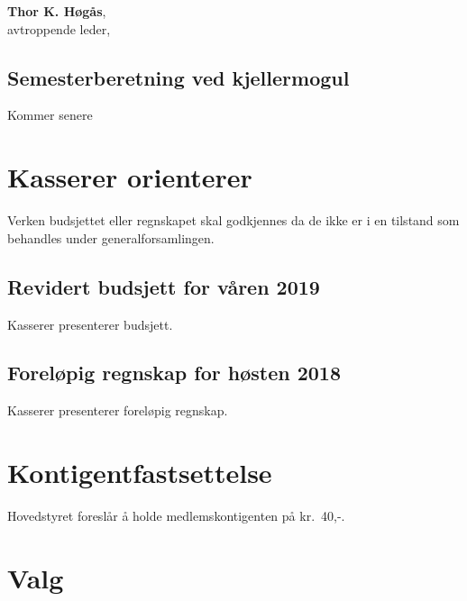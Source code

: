 \documentclass[10pt,norsk,a4paper]{article}
\begin{document}
\textbf{Thor K. Høgås}, \\
avtroppende leder, \date{\emph{23. mai 2019}}

\newpage

\subsection{Semesterberetning ved kjellermogul}

Kommer senere


\newpage

\section{Kasserer orienterer}
Verken budsjettet eller regnskapet skal godkjennes da
de ikke er i en tilstand som behandles under generalforsamlingen.

\subsection{Revidert budsjett for våren 2019}
Kasserer presenterer budsjett.

\subsection{Foreløpig regnskap for høsten 2018}
Kasserer presenterer foreløpig regnskap.

\section{Kontigentfastsettelse}
Hovedstyret foreslår å holde medlemskontigenten på kr.~40,-.

\newpage

\section{Valg}
\end{document}
